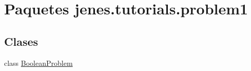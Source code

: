 \hypertarget{namespacejenes_1_1tutorials_1_1problem1}{\section{Paquetes jenes.\-tutorials.\-problem1}
\label{namespacejenes_1_1tutorials_1_1problem1}
}
\subsection*{Clases}
\begin{DoxyCompactItemize}
\item 
class \hyperlink{classjenes_1_1tutorials_1_1problem1_1_1_boolean_problem}{Boolean\-Problem}
\end{DoxyCompactItemize}
